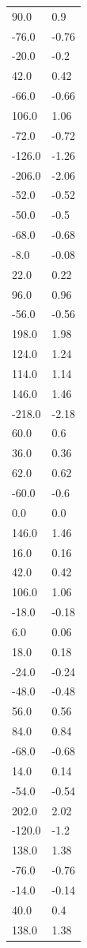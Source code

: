 \begin{longtable}{ll}
90.0 & 0.9 \\
-76.0 & -0.76 \\
-20.0 & -0.2 \\
42.0 & 0.42 \\
-66.0 & -0.66 \\
106.0 & 1.06 \\
-72.0 & -0.72 \\
-126.0 & -1.26 \\
-206.0 & -2.06 \\
-52.0 & -0.52 \\
-50.0 & -0.5 \\
-68.0 & -0.68 \\
-8.0 & -0.08 \\
22.0 & 0.22 \\
96.0 & 0.96 \\
-56.0 & -0.56 \\
198.0 & 1.98 \\
124.0 & 1.24 \\
114.0 & 1.14 \\
146.0 & 1.46 \\
-218.0 & -2.18 \\
60.0 & 0.6 \\
36.0 & 0.36 \\
62.0 & 0.62 \\
-60.0 & -0.6 \\
0.0 & 0.0 \\
146.0 & 1.46 \\
16.0 & 0.16 \\
42.0 & 0.42 \\
106.0 & 1.06 \\
-18.0 & -0.18 \\
6.0 & 0.06 \\
18.0 & 0.18 \\
-24.0 & -0.24 \\
-48.0 & -0.48 \\
56.0 & 0.56 \\
84.0 & 0.84 \\
-68.0 & -0.68 \\
14.0 & 0.14 \\
-54.0 & -0.54 \\
202.0 & 2.02 \\
-120.0 & -1.2 \\
138.0 & 1.38 \\
-76.0 & -0.76 \\
-14.0 & -0.14 \\
40.0 & 0.4 \\
138.0 & 1.38 \\

\end{longtable}
